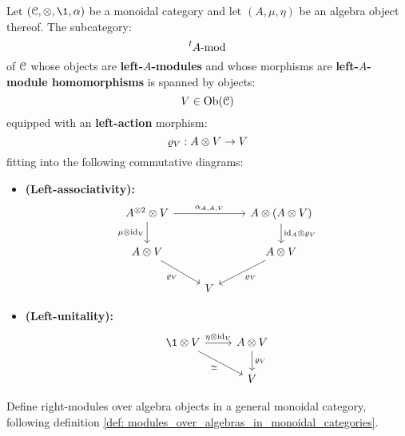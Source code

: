         \begin{definition} \label{def: modules_over_algebras_in_monoidal_categories}
            Let $(\C, \tensor, \1, \alpha)$ be a monoidal category and let $(A, \mu, \eta)$ be an algebra object thereof. The subcategory:
                $${}^lA\mod$$
            of $\C$ whose objects are \textbf{left-$A$-modules} and whose morphisms are \textbf{left-$A$-module homomorphisms} is spanned by objects:
                $$V \in \Ob(\C)$$
            equipped with an \textbf{left-action} morphism:
                $$\varrho_V: A \tensor V \to V$$
            fitting into the following commutative diagrams:
            \begin{itemize}
                \item \textbf{(Left-associativity):}
                    $$
                        \begin{tikzcd}
                        {A^{\tensor 2} \tensor V} && {A \tensor (A \tensor V)} \\
                        {A \tensor V} && {A \tensor V} \\
                        & V
                        \arrow["{\alpha_{A, A, V}}", from=1-1, to=1-3]
                        \arrow["{\mu \tensor \id_V}"', from=1-1, to=2-1]
                        \arrow["{\id_A \tensor \varrho_V}", from=1-3, to=2-3]
                        \arrow["{\varrho_V}"', from=2-1, to=3-2]
                        \arrow["{\varrho_V}", from=2-3, to=3-2]
                        \end{tikzcd}
                    $$
                \item \textbf{(Left-unitality):}
                    $$
                        \begin{tikzcd}
                        {\1 \tensor V} & {A \tensor V} \\
                        & V
                        \arrow["{\eta \tensor \id_V}", from=1-1, to=1-2]
                        \arrow["\cong"', from=1-1, to=2-2]
                        \arrow["{\varrho_V}", from=1-2, to=2-2]
                        \end{tikzcd}
                    $$
            \end{itemize}
        \end{definition}
        \begin{question}
            Define right-modules over algebra objects in a general monoidal category, following definition \ref{def: modules_over_algebras_in_monoidal_categories}.
        \end{question}

